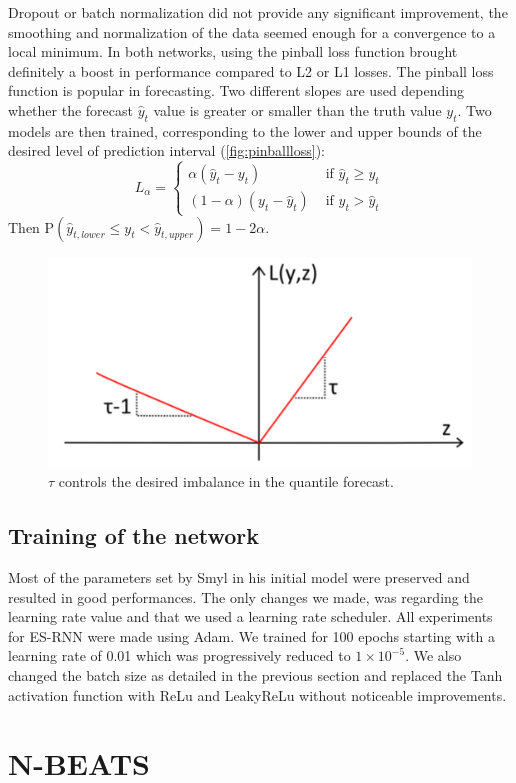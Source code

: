 \documentclass{article}
\newcommand{\p}{\mathrm{P}}
\begin{document}
Dropout or batch normalization did not provide any significant improvement, the smoothing and normalization of the data seemed enough for a convergence to a local minimum.
In both networks, using the pinball loss \cite{pinballloss}  function brought definitely a boost in performance compared to L2 or L1 losses. The pinball loss function is popular in forecasting. 
Two different slopes are used depending whether the forecast $\hat{y}_t$ value is greater
or smaller than the truth value $y_t$. Two models are then trained, corresponding to the lower and upper bounds of the desired level of prediction interval (\autoref{fig:pinballloss}):
\[
	L_\alpha = 
	\begin{cases}
		\alpha (\hat{y}_t  - y_t) & \text{ if } \hat{y}_t \geq y_t \\
		(1-\alpha) (y_t - \hat{y}_t) & \text{ if }  y_t > \hat{y}_t
	\end{cases}
\]
Then $\p(\hat{y}_{t, lower} \le y_t < \hat{y}_{t, upper}) = 1 - 2 \alpha$.
\begin{figure}[!ht]
\centering
	\includegraphics[width=0.4\columnwidth]{pinballloss.png} 
\caption{$\tau$ controls the desired imbalance in the quantile forecast.}
\label{fig:pinballloss}
\end{figure}

\subsection{Training of the network}

Most of the parameters set by Smyl in his initial model were preserved and resulted in good performances. 
The only changes we made, was regarding the learning rate value and that we used a learning rate scheduler.  All experiments for ES-RNN were made 
using Adam. We trained for 100 epochs starting with a learning rate of 0.01 which was progressively reduced to $1 \times 10^{-5}$.
We also changed the batch size as detailed in the previous section and replaced the Tanh activation function with ReLu and LeakyReLu without noticeable improvements.


\section{N-BEATS}
\label{NBEATS}
\end{document}
